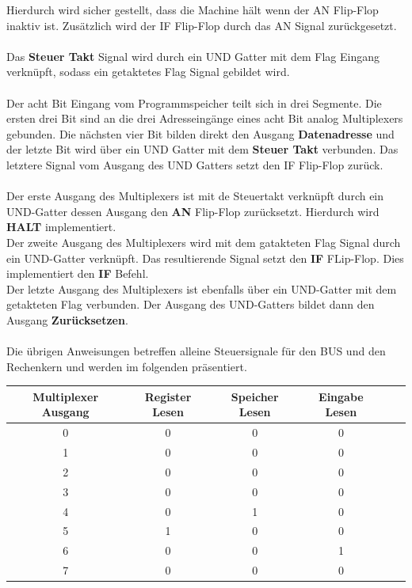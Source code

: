 \documentclass[11pt,a4paper,leqno]{report}
\numberwithin{equation}{chapter}
\begin{document}
Hierdurch wird sicher gestellt, dass die Machine h\"alt wenn der AN Flip-Flop inaktiv ist. Zus\"atzlich wird der IF Flip-Flop durch das AN Signal zur\"uckgesetzt.\\
\\
Das \textbf{Steuer Takt} Signal wird durch ein UND Gatter mit dem Flag Eingang verkn\"upft, sodass ein getaktetes Flag Signal gebildet wird.\\
\\
Der acht Bit Eingang vom Programmspeicher teilt sich in drei Segmente. Die ersten drei Bit sind an die drei Adresseing\"ange eines acht Bit analog Multiplexers gebunden. Die n\"achsten vier Bit bilden direkt den Ausgang \textbf{Datenadresse} und der letzte Bit wird \"uber ein UND Gatter mit dem \textbf{Steuer Takt} verbunden. Das letztere Signal vom Ausgang des UND Gatters setzt den IF Flip-Flop zur\"uck.\\
\\
Der erste Ausgang des Multiplexers ist mit de Steuertakt verkn\"upft durch ein UND-Gatter dessen Ausgang den \textbf{AN} Flip-Flop zur\"ucksetzt. Hierdurch wird \textbf{HALT} implementiert.\\
Der zweite Ausgang des Multiplexers wird mit dem gatakteten Flag Signal durch ein UND-Gatter verkn\"upft. Das resultierende Signal setzt den \textbf{IF} FLip-Flop.
Dies implementiert den \textbf{IF} Befehl.\\
Der letzte Ausgang des Multiplexers ist ebenfalls \"uber ein UND-Gatter mit dem getakteten Flag verbunden. Der Ausgang des UND-Gatters bildet dann den Ausgang \textbf{Zur\"ucksetzen}.\\
\\
Die \"ubrigen Anweisungen betreffen alleine Steuersignale f\"ur den BUS und den Rechenkern und werden im folgenden pr\"asentiert.
\begin{center}
	\begin{tabular}{|c|c|c|c|c|c|}
		\textbf{Multiplexer Ausgang} & Register Lesen & Speicher Lesen & Eingabe Lesen \\
		\hline
		0 & 0 & 0 & 0 \\
		1 & 0 & 0 & 0 \\
		2 & 0 & 0 & 0 \\
		3 & 0 & 0 & 0 \\
		4 & 0 & 1 & 0 \\
		5 & 1 & 0 & 0 \\
		6 & 0 & 0 & 1 \\
		7 & 0 & 0 & 0 \\
	\end{tabular}  
\end{center}
\end{document}
